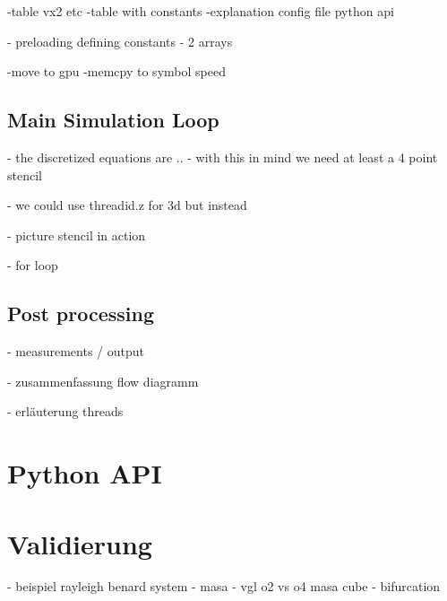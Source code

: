 -table vx2  etc
-table with constants
-explanation config file python api

- preloading defining constants
- 2 arrays

-move to gpu
-memcpy to symbol speed

\subsection{Main Simulation Loop}
- the discretized equations are ..
- with this in mind we need at least a 4 point stencil

- we could use threadid.z for 3d but instead

- picture stencil in action

- for loop

\subsection{Post processing}
- measurements / output

- zusammenfassung flow diagramm

- erläuterung threads

\section{Python API}

\section{Validierung}
- beispiel rayleigh benard system
- masa
- vgl o2 vs o4 masa cube
- bifurcation

\newpage

